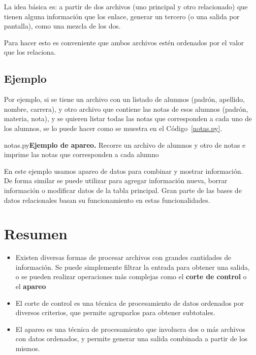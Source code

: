 La idea básica es: a partir de dos archivos (uno principal y otro
relacionado) que tienen alguna información que los enlace, generar un
tercero (o una salida por pantalla), como una mezcla de los dos.

Para hacer esto es conveniente que ambos archivos estén ordenados por el valor
que los relaciona.

\subsection*{Ejemplo}

Por ejemplo, si se tiene un archivo con un listado de alumnos (padrón,
apellido, nombre, carrera), y otro archivo que contiene las notas de esos
alumnos (padrón, materia, nota), y se quieren listar todas las notas que
corresponden a cada uno de los alumnos, se lo puede hacer como se muestra en el
Código~\ref{notas.py}.

\begin{codigo}{notas.py}{{\bf Ejemplo de apareo.} Recorre un archivo de alumnos
	y otro de notas e imprime las notas que corresponden a cada alumno}
\label{notas.py}

\end{codigo}

En este ejemplo usamos apareo de datos para combinar y mostrar
información. De forma similar se puede utilizar para agregar información nueva,
borrar información o modificar datos de la tabla principal. Gran parte de las
bases de datos relacionales basan su funcionamiento en estas funcionalidades.

\section{Resumen}

\begin{itemize}

\item Existen diversas formas de procesar archivos con grandes cantidades de
	información. Se puede simplemente filtrar la entrada para obtener una
	salida, o se pueden realizar operaciones más complejas como el {\bf corte
	de control} o el {\bf apareo}

\item El corte de control es una técnica de procesamiento de datos
ordenados por diversos criterios, que permite agruparlos para obtener
subtotales.

\item El apareo es una técnica de procesamiento que involucra dos o más
	archivos con datos ordenados, y permite generar una salida combinada a
	partir de los mismos.

\end{itemize}

